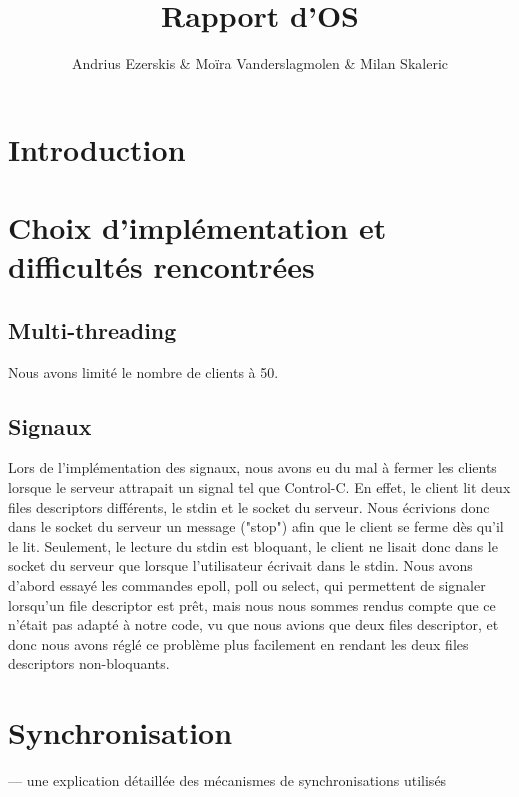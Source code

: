 \documentclass[utf8]{article}
\begin{document}
\begin{titlepage}
    

\author{Andrius Ezerskis \& Moïra Vanderslagmolen \& Milan Skaleric}
\title{Rapport d'OS}

\maketitle
\end{titlepage}

\section{Introduction}
\par
\section{Choix d'implémentation et difficultés rencontrées}
\subsection{Multi-threading}
Nous avons limité le nombre de clients à 50.
\subsection{Signaux}
\par
\indent
Lors de l'implémentation des signaux, nous avons eu du mal à fermer les clients lorsque le serveur attrapait un signal tel que Control-C. 
En effet, le client lit deux files descriptors différents, le stdin et le socket du serveur. Nous écrivions donc dans le socket du serveur un message ("stop")
afin que le client se ferme dès qu'il le lit. Seulement, le lecture du stdin est bloquant, le client ne lisait donc dans le socket du serveur que lorsque l'utilisateur
écrivait dans le stdin. 
Nous avons d'abord essayé les commandes epoll, poll ou select, qui permettent de signaler lorsqu'un file descriptor est prêt, mais nous nous sommes rendus compte que
ce n'était pas adapté à notre code, vu que nous avions que deux files descriptor, et donc nous avons réglé ce problème plus facilement en rendant les deux files descriptors non-bloquants.
\par

\section{Synchronisation}
— une explication détaillée des mécanismes de synchronisations utilisés
\end{document}
